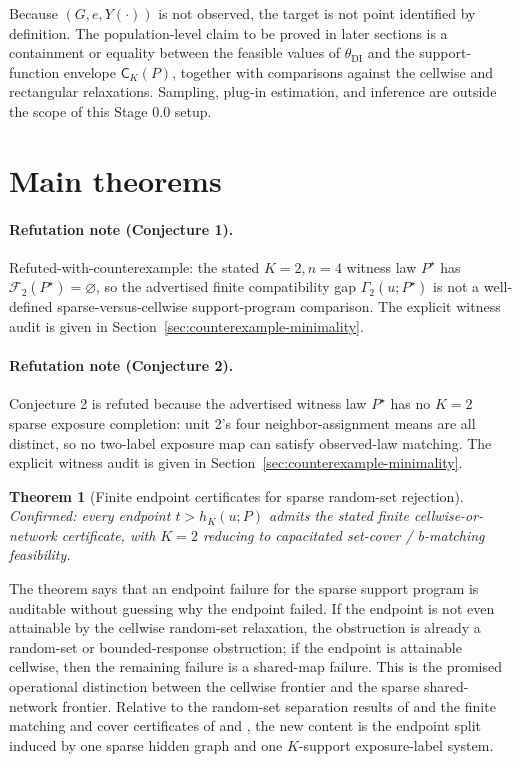 \documentclass[11pt]{article}
\theoremstyle{definition}
\theoremstyle{plain}
\newtheorem{theorem}{Theorem}
\theoremstyle{remark}
\begin{document}
Because \((G,e,Y(\cdot))\) is not observed, the target is not point identified by definition.  The population-level claim to be proved in later sections is a containment or equality between the feasible values of \(\theta_{\mathrm{DI}}\) and the support-function envelope \(\mathsf C_K(P)\), together with comparisons against the cellwise and rectangular relaxations.  Sampling, plug-in estimation, and inference are outside the scope of this Stage 0.0 setup.

\section{Main theorems}
\paragraph{Refutation note (Conjecture 1).}
Refuted-with-counterexample: the stated \(K=2,n=4\) witness law \(P^\star\) has \(\mathcal F_2(P^\star)=\varnothing\), so the advertised finite compatibility gap \(\Gamma_2(u;P^\star)\) is not a well-defined sparse-versus-cellwise support-program comparison.  The explicit witness audit is given in Section~\ref{sec:counterexample-minimality}.

\paragraph{Refutation note (Conjecture 2).}
Conjecture 2 is refuted because the advertised witness law \(P^\star\) has no \(K=2\) sparse exposure completion: unit 2's four neighbor-assignment means are all distinct, so no two-label exposure map can satisfy observed-law matching.  The explicit witness audit is given in Section~\ref{sec:counterexample-minimality}.

\begin{theorem}[Finite endpoint certificates for sparse random-set rejection]\label{thm:certificate}
Confirmed: every endpoint \(t>h_K(u;P)\) admits the stated finite cellwise-or-network certificate, with \(K=2\) reducing to capacitated set-cover / b-matching feasibility.
\end{theorem}

The theorem says that an endpoint failure for the sparse support program is auditable without guessing why the endpoint failed.  If the endpoint is not even attainable by the cellwise random-set relaxation, the obstruction is already a random-set or bounded-response obstruction; if the endpoint is attainable cellwise, then the remaining failure is a shared-map failure.  This is the promised operational distinction between the cellwise frontier and the sparse shared-network frontier.  Relative to the random-set separation results of \cite{BeresteanuMolchanovMolinari2011} and the finite matching and cover certificates of \cite{EdmondsMatchingPolytope1965} and \cite{Wolsey1975}, the new content is the endpoint split induced by one sparse hidden graph and one \(K\)-support exposure-label system.
\end{document}
